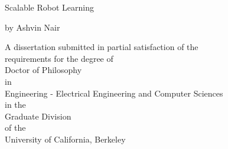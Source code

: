 
\begin{titlepage}
    \begin{center}
        \large  

        \hfill


        \begingroup
            \normalsize{Scalable Robot Learning} %
        \endgroup
        
	

        \vfill

        \medskip

        \normalsize{by} 
        \vfill  
        \medskip
        \normalsize{Ashvin Nair}

        \vfill                      

    \end{center}  

\thispagestyle{empty}



\vfill

\begin{center}
\begin{spacing}{2.0}
A dissertation submitted in partial satisfaction of the \\
requirements for the degree of  \\ 
Doctor of Philosophy \\ 
in \\ 
Engineering - Electrical Engineering and Computer Sciences \\
in the \\
Graduate Division \\
of the \\ 
University of California, Berkeley
\end{spacing}
\end{center}


\end{titlepage}
